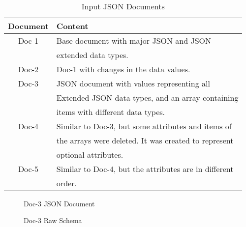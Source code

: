 \documentclass[sigconf, nonacm]{acmart}
\begin{document}
\begin{table}[b]%
	\caption{Input JSON Documents}
	\label{tab:docs}
	\begin{tabular}{cl}
		\toprule
		Document & Content \\
		\midrule
		Doc-1 & Base document with major JSON and JSON \\
		 & extended data types. \\
		Doc-2 & Doc-1 with changes in the data values. \\
		Doc-3 & JSON document with values representing all \\
		 & Extended JSON data types, and an array containing \\
		  & items with different data types. \\
		Doc-4 & Similar to Doc-3, but some attributes and items of \\
		 & the arrays were deleted. It was created to represent \\
		  & optional attributes. \\
		Doc-5 & Similar to Doc-4, but the attributes are in different \\
		 & order. \\
		\bottomrule
	\end{tabular}
\end{table}

\begin{figure}[b]
	\centering
	\caption{Doc-3 JSON Document}
	\label{fig:doc3}
	
\end{figure}

\begin{figure}[b]
	\centering
	\caption{Doc-3 Raw Schema}
	\label{fig:schema3}
	
\end{figure}




\end{document}
